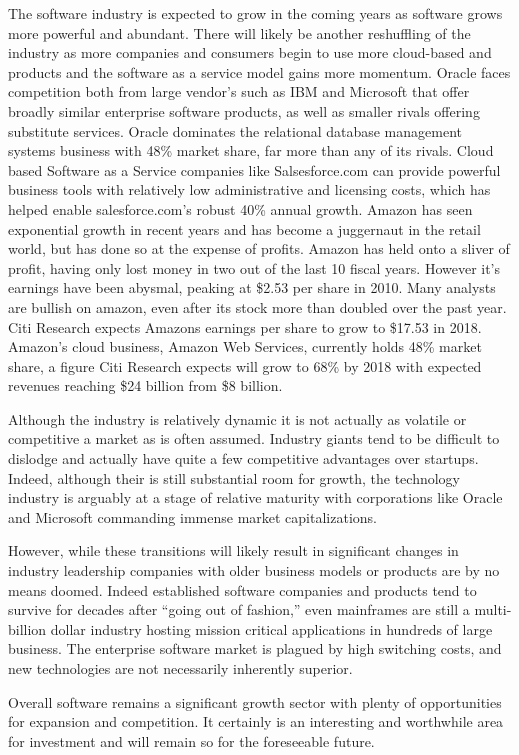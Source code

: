 The software industry is expected to grow in the coming years as software grows more powerful and abundant.\autocite[21]{SurveysSoftware2015}
There will likely be another reshuffling of the industry as more companies and consumers begin to use more cloud-based and products and the software as a service model gains more momentum.
Oracle faces competition both from large vendor's such as IBM and Microsoft that offer broadly similar enterprise software products, as well as smaller rivals offering substitute services.\autocite[]{finkle2012larry}
Oracle dominates the relational database management systems business with 48\% market share, far more than any of its rivals.\autocite[]{finkle2012larry}
Cloud based Software as a Service companies like Salsesforce.com can provide powerful business tools with relatively low administrative and licensing costs, which has helped enable salesforce.com's robust 40\% annual growth.\autocite[]{HorizontalPlaysTechnology}
Amazon has seen exponential growth in recent years and has become a juggernaut in the retail world, but has done so at the expense of profits.\autocite[]{AmazonProfit}
Amazon has held onto a sliver of profit, having only lost money in two out of the last 10 fiscal years. However it's earnings have been abysmal, peaking at \$2.53 per share in 2010.\autocite[]{AmazonProfit}
Many analysts are bullish on amazon, even after its stock more than doubled over the past year.\autocite[]{AmazonDouble}
Citi Research expects Amazons earnings per share to grow to \$17.53 in 2018.\autocite[]{AmazonProfit}
Amazon's cloud business, Amazon Web Services, currently holds 48\% market share, a figure Citi Research expects will grow to 68\% by 2018 with expected revenues reaching \$24 billion from \$8 billion.\autocite[]{AmazonProfit}

Although the industry is relatively dynamic it is not actually as volatile or competitive a market as is often assumed.
Industry giants tend to be difficult to dislodge and actually have quite a few competitive advantages over startups.
Indeed, although their is still substantial room for growth, the technology industry is arguably at a stage of relative maturity with corporations like Oracle and Microsoft commanding immense market capitalizations.\autocite[]{finkle2012larry}

However, while these transitions will likely result in significant changes in industry leadership companies with older business models or products are by no means doomed.
Indeed established software companies and products tend to survive for decades after ``going out of fashion,'' even mainframes are still a multi-billion dollar industry hosting mission critical applications in hundreds of large business.\autocite{MainframesStillAround}
The enterprise software market is plagued by high switching costs,\autocite[]{finkle2012larry} and new technologies are not necessarily inherently superior.

Overall software remains a significant growth sector with plenty of opportunities for expansion and competition.
It certainly is an interesting and worthwhile area for investment and will remain so for the foreseeable future.
